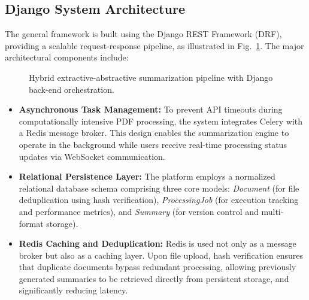 \documentclass[conference]{IEEEtran}
\begin{document}
\subsection{Django System Architecture}

The general framework is built using the Django REST Framework (DRF)\cite{13}, providing a scalable request-response pipeline, as illustrated in Fig.~\ref{fig:architecture}. The major architectural components include:

\begin{figure}[!htbp]
    \centering
    \caption{Hybrid extractive-abstractive summarization pipeline with Django back-end orchestration.}
    \label{fig:architecture}
\end{figure}

\begin{itemize}

    \item \textbf{Asynchronous Task Management:} To prevent API timeouts during computationally intensive PDF processing, the system integrates Celery with a Redis message broker\cite{13, 16}. This design enables the summarization engine to operate in the background while users receive real-time processing status updates via WebSocket communication\cite{16}.
    
    \item \textbf{Relational Persistence Layer:} The platform employs a normalized relational database schema comprising three core models: \textit{Document} (for file deduplication using hash verification), \textit{ProcessingJob} (for execution tracking and performance metrics), and \textit{Summary} (for version control and multi-format storage)\cite{13}.
    
    \item \textbf{Redis Caching and Deduplication:} Redis is used not only as a message broker but also as a caching layer\cite{13, 16}. Upon file upload, hash verification ensures that duplicate documents bypass redundant processing, allowing previously generated summaries to be retrieved directly from persistent storage, and significantly reducing latency\cite{16}.
    
\end{itemize}
\end{document}
